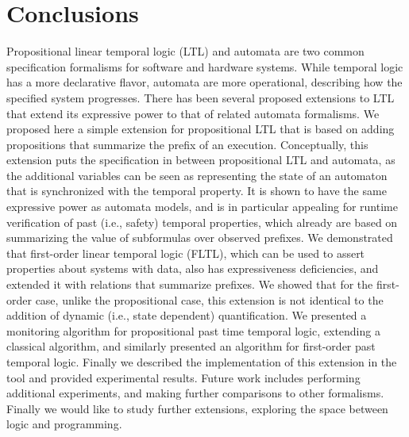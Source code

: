 
\section{Conclusions}

Propositional linear temporal logic (LTL) and automata are two common specification formalisms for software and hardware systems. While temporal logic has a more declarative
flavor, automata are more operational, describing how the specified system
progresses. There has been several proposed extensions to LTL that extend
its expressive power to that of related automata formalisms. We proposed here
a simple extension for propositional LTL that is based on adding propositions that summarize the prefix of an execution. Conceptually, this extension puts the specification in between propositional LTL and automata, as the additional
variables can be seen as representing the state of an automaton
that is synchronized with the temporal property. It is shown to have
the same expressive power as automata models, and is in particular
appealing for runtime verification of past (i.e., safety) temporal properties,
which already are based on summarizing the value of subformulas over
observed prefixes.
%
We demonstrated that first-order linear temporal logic (FLTL), which
can be used to assert properties about systems with data, also has expressiveness deficiencies, and extended it with relations that summarize prefixes.
We showed that for the first-order case, unlike the propositional case,
this extension is not identical to the addition of dynamic (i.e., state dependent) quantification.
%
We presented a monitoring
algorithm for propositional past time temporal logic, extending a classical algorithm, and similarly presented an algorithm for 
first-order past temporal logic.
Finally we described the implementation of this extension in the \dejavu{} tool and provided experimental results.
%
Future work includes performing additional experiments, and making further comparisons to other formalisms. Finally we would like to study further extensions, exploring the space between logic and programming.